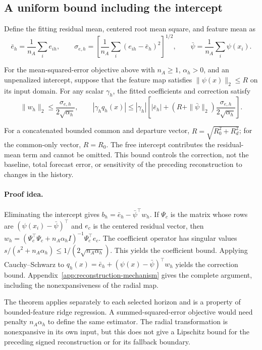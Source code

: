 \subsection{A uniform bound including the intercept}

Define the fitting residual mean, centered root mean square, and feature
mean as
\[
 \bar e_h=\frac1{n_A}\sum_i e_{ih},\qquad
 \sigma_{e,h}=\left[\frac1{n_A}\sum_i(e_{ih}-\bar e_h)^2\right]^{1/2},
 \qquad
 \bar\psi=\frac1{n_A}\sum_i\psi(x_i).
\]
\begin{proposition}
\label{prop:mechanism-correction-bound}
For the mean-squared-error objective above with $n_A\geq1$,
$\alpha_h>0$, and an unpenalized intercept, suppose that the feature
map satisfies $\|\psi(x)\|_2\leq R$ on its input domain.
For any scalar $\gamma_h$, the fitted coefficients and correction satisfy
\begin{equation}
 \|w_h\|_2\le\frac{\sigma_{e,h}}{2\sqrt{\alpha_h}},\qquad
 |\gamma_h q_h(x)|\le |\gamma_h|\left[
 |\bar e_h|+(R+\|\bar\psi\|_2)
 \frac{\sigma_{e,h}}{2\sqrt{\alpha_h}}\right].
 \label{eq:mechanism-main-correction-bound}
\end{equation}
\end{proposition}
For a concatenated bounded common and departure vector,
$R=\sqrt{R_0^2+R_d^2}$; for the common-only vector, $R=R_0$.
The free intercept contributes the residual-mean term and cannot be
omitted. This bound controls the correction, not the baseline, total
forecast error, or sensitivity of the preceding reconstruction to changes
in the history.


\paragraph{Proof idea.}
Eliminating the intercept gives
$b_h=\bar e_h-\bar\psi^\top w_h$. If $\Psi_c$ is the matrix whose
rows are $(\psi(x_i)-\bar\psi)^\top$ and $e_c$ is the centered
residual vector, then
$w_h=(\Psi_c^\top\Psi_c+n_A\alpha_h I)^{-1}\Psi_c^\top e_c$.
The coefficient operator has singular values
$s/(s^2+n_A\alpha_h)\leq1/(2\sqrt{n_A\alpha_h})$.
This yields the coefficient bound. Applying Cauchy--Schwarz to
$q_h(x)=\bar e_h+(\psi(x)-\bar\psi)^\top w_h$ yields the
correction bound. Appendix~\ref{app:reconstruction-mechanism} gives
the complete argument, including the nonexpansiveness of the radial map.

The theorem applies separately to each selected horizon and is a property
of bounded-feature ridge regression. A summed-squared-error objective
would need penalty $n_A\alpha_h$ to define the same estimator. The
radial transformation is nonexpansive in its own input, but this does
not give a Lipschitz bound for the preceding signed reconstruction or
for its fallback boundary.

